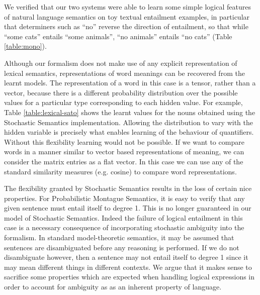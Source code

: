 \documentclass[11pt]{article}
\theoremstyle{definition}
\begin{document}
We verified that our two systems were able to learn some simple
logical features of natural language semantics on toy textual
entailment examples, in particular that determiners such as ``no''
reverse the direction of entailment, so that while ``some cats''
entails ``some animals'', ``no animals'' entails ``no cats'' (Table
\ref{table:mono}).

Although our formalism does not make use of any explicit representation of lexical semantics, representations of word meanings can be recovered from the learnt models. The representation of a word in this case is a tensor, rather than a vector, because there is a different probability distribution over the possible values for a particular type corresponding to each hidden value. For example, Table \ref{table:lexical-sato} shows the learnt values for the nouns obtained using the Stochastic Semantics implementation. Allowing the distribution to vary with the hidden variable is precisely what enables learning of the behaviour of quantifiers. Without this flexibility learning would not be possible. If we want to compare words in a manner similar to vector based
representations of meaning, we can consider the matrix entries as a
flat vector. In this case we can use any of the standard similarity measures (e.g. 
cosine) to compare word representations.



The flexibility granted by Stochastic Semantics results in the loss of certain nice properties. For Probabilistic Montague Semantics, it is easy to verify that any given sentence must entail itself to degree 1. This is no longer guaranteed in our model of Stochastic Semantics. Indeed the failure of logical entailment in this case is a necessary consequence of incorporating stochastic ambiguity into the formalism. In standard model-theoretic semantics, it may be assumed that sentences are disambiguated before any reasoning is performed. If we do not disambiguate however, then a sentence may not entail itself to degree 1 since it may mean different things in different contexts. We argue that it makes sense to sacrifice some properties which are expected when handling logical expressions in order to account for ambiguity as as an inherent property of language.
\end{document}
